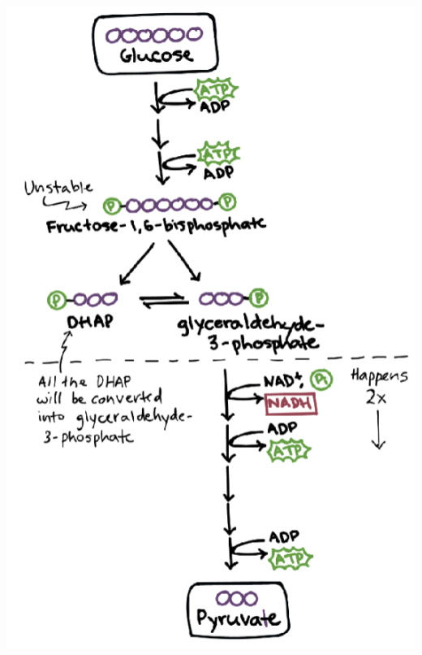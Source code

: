 \documentclass[10pt]{article}
\begin{document}
\begin{center}
    \includegraphics*[scale=0.5]{L1_2.png}
\end{center}
\end{document}
